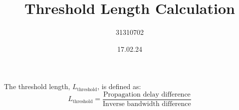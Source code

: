 \documentclass{article}
\begin{document}
\title{Threshold Length Calculation}
\author  {31310702}
\date{17.02.24}

\maketitle

The threshold length, \( L_{\text{threshold}} \), is defined as:
\begin{equation}
L_{\text{threshold}} = \frac{\text{Propagation delay difference}}{\text{Inverse bandwidth difference}}
\end{equation}
\end{document}

